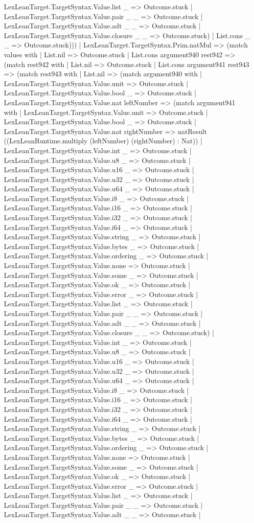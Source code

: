 \documentclass[11pt]{article}
\begin{document}
LexLeanTarget.TargetSyntax.Value.list \_ => Outcome.stuck | LexLeanTarget.TargetSyntax.Value.pair \_ \_ => Outcome.stuck | LexLeanTarget.TargetSyntax.Value.adt \_ \_ => Outcome.stuck | LexLeanTarget.TargetSyntax.Value.closure \_ \_ => Outcome.stuck) | List.cons \_ \_ => Outcome.stuck))) | LexLeanTarget.TargetSyntax.Prim.natMul => (match values with | List.nil => Outcome.stuck | List.cons argument940 rest942 => (match rest942 with | List.nil => Outcome.stuck | List.cons argument941 rest943 => (match rest943 with | List.nil => (match argument940 with | LexLeanTarget.TargetSyntax.Value.unit => Outcome.stuck | LexLeanTarget.TargetSyntax.Value.bool \_ => Outcome.stuck | LexLeanTarget.TargetSyntax.Value.nat leftNumber => (match argument941 with | LexLeanTarget.TargetSyntax.Value.unit => Outcome.stuck | LexLeanTarget.TargetSyntax.Value.bool \_ => Outcome.stuck | LexLeanTarget.TargetSyntax.Value.nat rightNumber => natResult ((LexLeanRuntime.multiply (leftNumber) (rightNumber) : Nat)) | LexLeanTarget.TargetSyntax.Value.int \_ => Outcome.stuck | LexLeanTarget.TargetSyntax.Value.u8 \_ => Outcome.stuck | LexLeanTarget.TargetSyntax.Value.u16 \_ => Outcome.stuck | LexLeanTarget.TargetSyntax.Value.u32 \_ => Outcome.stuck | LexLeanTarget.TargetSyntax.Value.u64 \_ => Outcome.stuck | LexLeanTarget.TargetSyntax.Value.i8 \_ => Outcome.stuck | LexLeanTarget.TargetSyntax.Value.i16 \_ => Outcome.stuck | LexLeanTarget.TargetSyntax.Value.i32 \_ => Outcome.stuck | LexLeanTarget.TargetSyntax.Value.i64 \_ => Outcome.stuck | LexLeanTarget.TargetSyntax.Value.string \_ => Outcome.stuck | LexLeanTarget.TargetSyntax.Value.bytes \_ => Outcome.stuck | LexLeanTarget.TargetSyntax.Value.ordering \_ => Outcome.stuck | LexLeanTarget.TargetSyntax.Value.none => Outcome.stuck | LexLeanTarget.TargetSyntax.Value.some \_ => Outcome.stuck | LexLeanTarget.TargetSyntax.Value.ok \_ => Outcome.stuck | LexLeanTarget.TargetSyntax.Value.error \_ => Outcome.stuck | LexLeanTarget.TargetSyntax.Value.list \_ => Outcome.stuck | LexLeanTarget.TargetSyntax.Value.pair \_ \_ => Outcome.stuck | LexLeanTarget.TargetSyntax.Value.adt \_ \_ => Outcome.stuck | LexLeanTarget.TargetSyntax.Value.closure \_ \_ => Outcome.stuck) | LexLeanTarget.TargetSyntax.Value.int \_ => Outcome.stuck | LexLeanTarget.TargetSyntax.Value.u8 \_ => Outcome.stuck | LexLeanTarget.TargetSyntax.Value.u16 \_ => Outcome.stuck | LexLeanTarget.TargetSyntax.Value.u32 \_ => Outcome.stuck | LexLeanTarget.TargetSyntax.Value.u64 \_ => Outcome.stuck | LexLeanTarget.TargetSyntax.Value.i8 \_ => Outcome.stuck | LexLeanTarget.TargetSyntax.Value.i16 \_ => Outcome.stuck | LexLeanTarget.TargetSyntax.Value.i32 \_ => Outcome.stuck | LexLeanTarget.TargetSyntax.Value.i64 \_ => Outcome.stuck | LexLeanTarget.TargetSyntax.Value.string \_ => Outcome.stuck | LexLeanTarget.TargetSyntax.Value.bytes \_ => Outcome.stuck | LexLeanTarget.TargetSyntax.Value.ordering \_ => Outcome.stuck | LexLeanTarget.TargetSyntax.Value.none => Outcome.stuck | LexLeanTarget.TargetSyntax.Value.some \_ => Outcome.stuck | LexLeanTarget.TargetSyntax.Value.ok \_ => Outcome.stuck | LexLeanTarget.TargetSyntax.Value.error \_ => Outcome.stuck | LexLeanTarget.TargetSyntax.Value.list \_ => Outcome.stuck | LexLeanTarget.TargetSyntax.Value.pair \_ \_ => Outcome.stuck | LexLeanTarget.TargetSyntax.Value.adt \_ \_ => Outcome.stuck | 
\end{document}

